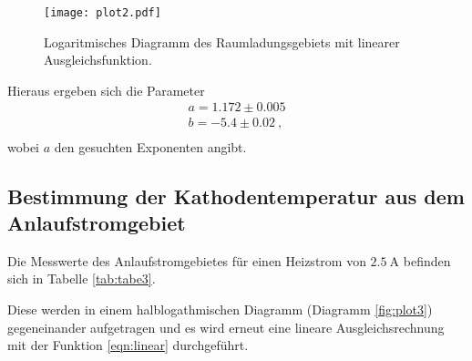 \begin{figure}[H]
  \centering
  \texttt{[image: plot2.pdf]}
  \caption{Logaritmisches Diagramm des Raumladungsgebiets mit linearer Ausgleichsfunktion.}
  \label{fig:plot2}
\end{figure}

Hieraus ergeben sich die Parameter
\begin{align*}
  a = 1.172 \pm 0.005 \\
  b = -5.4 \pm 0.02 \: ,\\
\end{align*}
wobei $a$ den gesuchten Exponenten angibt.
\subsection{Bestimmung der Kathodentemperatur aus dem Anlaufstromgebiet}
Die Messwerte des Anlaufstromgebietes für einen Heizstrom von $\SI{2.5}{\ampere}$
befinden sich in Tabelle \ref{tab:tabe3}.

Diese werden in einem halblogathmischen Diagramm (Diagramm \ref{fig:plot3}) gegeneinander
aufgetragen und es wird erneut eine lineare Ausgleichsrechnung mit der Funktion \ref{eqn:linear}
durchgeführt.

